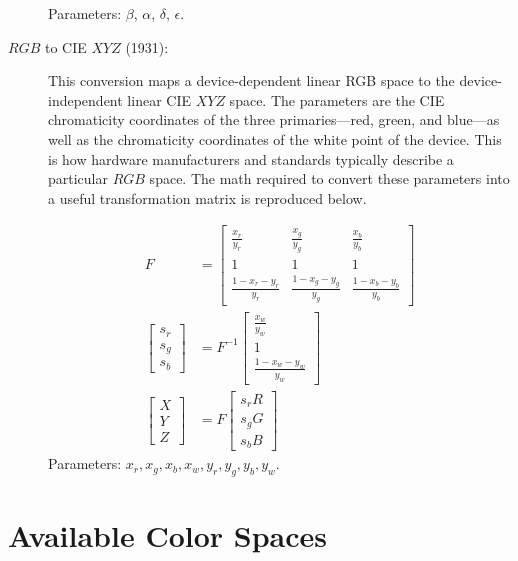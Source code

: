 \documentclass[11pt,letterpaper]{book}
\numberwithin{equation}{chapter}
\numberwithin{figure}{chapter}
\numberwithin{table}{chapter}
\begin{document}
\begin{description}
Parameters: $\beta$, $\alpha$, $\delta$, $\epsilon$.

\item[$RGB$ to CIE $XYZ$ (1931):]
\vspace{\baselineskip}\hfill

This conversion maps a device-dependent linear RGB space to the
 device-independent linear CIE $XYZ$ space.
The parameters are the CIE chromaticity coordinates of the three
 primaries---red, green, and blue---as well as the chromaticity coordinates
 of the white point of the device.
This is how hardware manufacturers and standards typically describe a
 particular $RGB$ space.
The math required to convert these parameters into a useful transformation
 matrix is reproduced below.

\begin{align}
F                  & =
\left[\begin{array}{ccc}
\frac{x_r}{y_r}       & \frac{x_g}{y_g}       & \frac{x_b}{y_b}       \\
1                     & 1                     & 1                     \\
\frac{1-x_r-y_r}{y_r} & \frac{1-x_g-y_g}{y_g} & \frac{1-x_b-y_b}{y_b}
\end{array}\right] \\
\left[\begin{array}{c}
s_r \\
s_g \\
s_b
\end{array}\right] & =
F^{-1}\left[\begin{array}{c}
\frac{x_w}{y_w} \\
1 \\
\frac{1-x_w-y_w}{y_w}
\end{array}\right] \\
\left[\begin{array}{c}
X \\
Y \\
Z
\end{array}\right] & =
F\left[\begin{array}{c}
s_rR \\
s_gG \\
s_bB
\end{array}\right]
\end{align}
Parameters: $x_r,x_g,x_b,x_w, y_r,y_g,y_b,y_w$.

\end{description}

\section{Available Color Spaces}
\label{sec:colorspaces}
\end{document}
